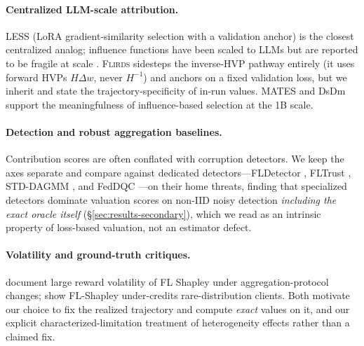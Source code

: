 \paragraph{Centralized LLM-scale attribution.}
LESS \citep{xia2024less} (LoRA gradient-similarity selection with a validation
anchor) is the closest centralized analog; influence functions have been scaled
to LLMs \citep{grosse2023, kwon2024datainf} but are reported to be fragile at
scale \citep{basu2021fragile, doifwork2025}. \textsc{Flirds} sidesteps the
inverse-HVP pathway entirely (it uses forward HVPs $H\Delta w$, never $H^{-1}$)
and anchors on a fixed validation loss, but we inherit and state the
trajectory-specificity of in-run values. MATES \citep{yu2024mates} and DsDm
\citep{engstrom2024dsdm} support the meaningfulness of influence-based selection
at the 1B scale.

\paragraph{Detection and robust aggregation baselines.}
Contribution scores are often conflated with corruption detectors. We keep the
axes separate and compare against dedicated detectors---FLDetector
\citep{zhang2022fldetector}, FLTrust \citep{cao2021fltrust}, STD-DAGMM
\citep{lin2019freerider}, and FedDQC \citep{feddqc2024}---on their home threats,
finding that specialized detectors dominate valuation scores on non-IID noisy
detection \emph{including the exact oracle itself}
(\S\ref{sec:results-secondary}), which we read as an intrinsic property of
loss-based valuation, not an estimator defect.

\paragraph{Volatility and ground-truth critiques.}
\citet{shapleyvolatility} document large reward volatility of FL Shapley under
aggregation-protocol changes; \citet{mavericks2024} show FL-Shapley under-credits
rare-distribution clients. Both motivate our choice to fix the realized
trajectory and compute \emph{exact} values on it, and our explicit
characterized-limitation treatment of heterogeneity effects rather than a
claimed fix.
